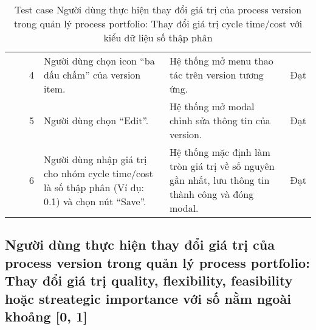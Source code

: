 \begin{table}[H]
{\begin{tabular}{|p{3cm}|p{1.5cm}|p{0.5cm}|p{4cm}|p{4cm}|>{\centering\arraybackslash}p{1cm}|}
            &
            &
            \multicolumn{1}{c|}{4} &
            Người dùng chọn icon “ba dấu chấm” của version item. &
            Hệ thống mở menu thao tác trên version tương ứng. &
            Đạt \\ \cline{3-6} 
            &
            &
            \multicolumn{1}{c|}{5} &
            Người dùng chọn “Edit”. &
            Hệ thống mở modal chỉnh sửa thông tin của version. &
            Đạt \\ \cline{3-6} 
            &
            &
            \multicolumn{1}{c|}{6} &
            Người dùng nhập giá trị cho nhóm cycle time/cost là số thập phân (Ví dụ: 0.1) và chọn nút “Save”. &
            Hệ thống mặc định làm tròn giá trị về số nguyên gần nhất, lưu thông tin thành công và đóng modal. &
            Đạt \\ \cline{3-6} \hline
        \end{tabular}
    }
    \caption{Test case Người dùng thực hiện thay đổi giá trị của process version trong quản lý process portfolio: Thay đổi giá trị cycle time/cost với kiểu dữ liệu số thập phân}
\end{table}

\subsection{Người dùng thực hiện thay đổi giá trị của process version trong quản lý process portfolio: Thay đổi giá trị quality, flexibility, feasibility hoặc streategic importance với số nằm ngoài khoảng [0, 1]}

